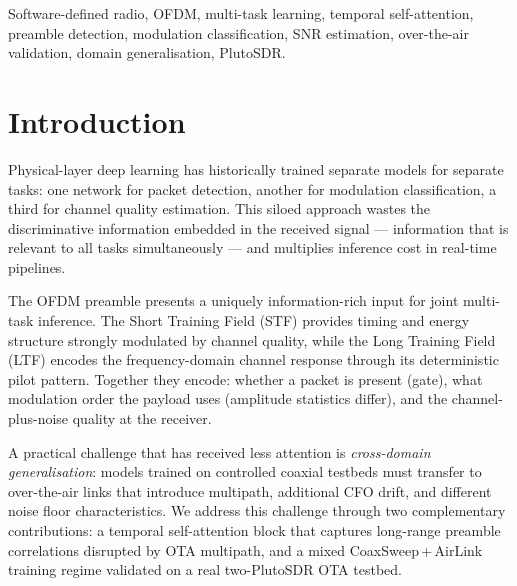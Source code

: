 \documentclass[conference]{IEEEtran}
\begin{document}
\begin{IEEEkeywords}
Software-defined radio, OFDM, multi-task learning, temporal self-attention,
preamble detection, modulation classification, SNR estimation,
over-the-air validation, domain generalisation, PlutoSDR.
\end{IEEEkeywords}

\section{Introduction}
\label{sec:intro}

Physical-layer deep learning has historically trained separate models
for separate tasks: one network for packet detection, another for
modulation classification, a third for channel quality estimation.
This siloed approach wastes the discriminative information embedded
in the received signal — information that is relevant to all tasks
simultaneously — and multiplies inference cost in real-time pipelines.

The OFDM preamble presents a uniquely information-rich input for joint
multi-task inference.
The Short Training Field (STF) provides timing and energy structure
strongly modulated by channel quality, while the Long Training Field
(LTF) encodes the frequency-domain channel response through its
deterministic pilot pattern.
Together they encode: whether a packet is present (gate), what
modulation order the payload uses (amplitude statistics differ), and
the channel-plus-noise quality at the receiver.

A practical challenge that has received less attention is
\emph{cross-domain generalisation}: models trained on controlled
coaxial testbeds must transfer to over-the-air links that introduce
multipath, additional CFO drift, and different noise floor
characteristics.
We address this challenge through two complementary contributions:
a temporal self-attention block that captures long-range preamble
correlations disrupted by OTA multipath, and a mixed
CoaxSweep\,+\,AirLink training regime validated on a real
two-PlutoSDR OTA testbed.
\end{document}
